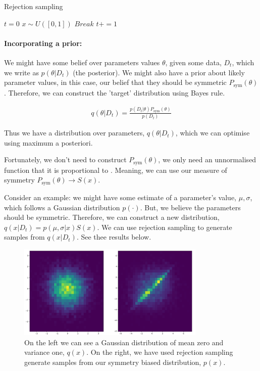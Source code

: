 \begin{algorithm}
	\caption{Rejection sampling}
	\begin{algorithmic}[1]

		\State $t=0$
			\State $x\sim U([0, 1])$
				\State $Break$
			\EndIf
			\State $t += 1$
		\EndWhile
		\State {}
		\EndProcedure

	\end{algorithmic}
\end{algorithm}

\paragraph{Incorporating a prior:} We might have some belief over parameters values $\theta$, given some data, $D_t$, which we write as $p(\theta| D_t)$ (the posterior).
We might also have a prior about likely parameter values, in this case, our belief that they should be symmetric $P_{\text{sym}}(\theta)$. Therefore, we can construct the 'target' distribution using Bayes rule.

\begin{align*}
q(\theta | D_t) = \frac{p(D_t | \theta)P_{\text{sym}}(\theta)}{p(D_t)}
\end{align*}

Thus we have a distribution over parameters, $q(\theta | D_t)$, which we can optimise using maximum a posteriori.

Fortunately, we don't need to construct $P_{\text{sym}}(\theta)$, we only need an unnormalised function that it is proportional to \cite{Owen2013}. Meaning, we can use our measure of symmetry $P_{\text{sym}}(\theta)\to S(x)$.

Consider an example: we might have some estimate of a parameter's value, $\mu, \sigma$, which follows a Gaussian distribution $p(\cdot)$. But, we believe the parameters should be symmetric. Therefore, we can construct a new distribution, $q(x | D_t) = p(\mu, \sigma| x)S(x)$. We can use rejection sampling to generate samples from $q(x | D_t)$. See thee results below.


\begin{figure}[h!]
  \centering
  \includegraphics[width=0.8\textwidth,height=0.175\textheight]{../../pictures/figures/symmetric-gaussian.png}
  \caption{On the left we can see a Gaussian distribution of mean zero and variance one, $q(x)$.
  On the right, we have used rejection sampling generate samples from our symmetry biased distribution, $p(x)$.}
\end{figure}


